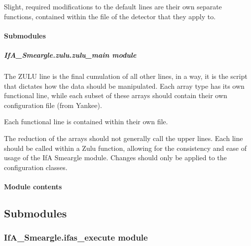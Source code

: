 \documentclass[letterpaper,10pt,english]{sphinxmanual}
\begin{document}
Slight, required modifications to the default lines are their own separate
functions, contained within the file of the detector that they apply to.


\paragraph{Submodules}
\label{\detokenize{python_docstrings/IfA_Smeargle.zulu:submodules}}

\subparagraph{IfA\_Smeargle.zulu.zulu\_main module}
\label{\detokenize{python_docstrings/IfA_Smeargle.zulu.zulu_main:module-IfA_Smeargle.zulu.zulu_main}}\label{\detokenize{python_docstrings/IfA_Smeargle.zulu.zulu_main:ifa-smeargle-zulu-zulu-main-module}}\label{\detokenize{python_docstrings/IfA_Smeargle.zulu.zulu_main::doc}}
The ZULU line is the final cumulation of all other lines, in a way, it is
the script that dictates how the data should be manipulated. Each array
type has its own functional line, while each subset of these arrays should
contain their own configuration file (from Yankee).

Each functional line is contained within their own file.

The reduction of the arrays should not generally call the upper lines.
Each line should be called within a Zulu function, allowing for the
consistency and ease of usage of the IfA Smeargle module. Changes should
only be applied to the configuration classes.


\paragraph{Module contents}
\label{\detokenize{python_docstrings/IfA_Smeargle.zulu:module-IfA_Smeargle.zulu}}\label{\detokenize{python_docstrings/IfA_Smeargle.zulu:module-contents}}

\subsection{Submodules}
\label{\detokenize{python_docstrings/IfA_Smeargle:submodules}}

\subsubsection{IfA\_Smeargle.ifas\_execute module}
\label{\detokenize{python_docstrings/IfA_Smeargle.ifas_execute:module-IfA_Smeargle.ifas_execute}}\label{\detokenize{python_docstrings/IfA_Smeargle.ifas_execute:ifa-smeargle-ifas-execute-module}}\label{\detokenize{python_docstrings/IfA_Smeargle.ifas_execute::doc}}
\end{document}
